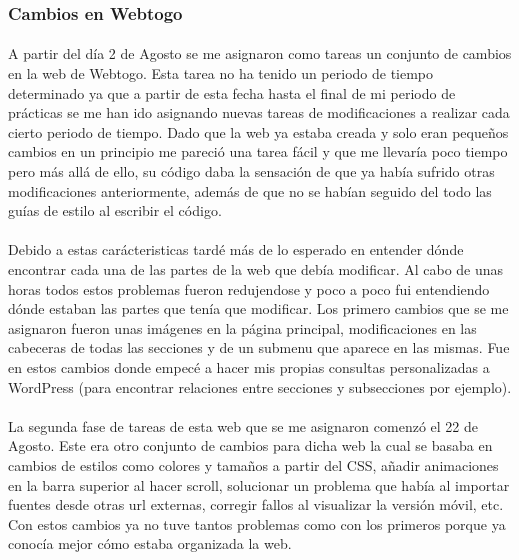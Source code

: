 \documentclass[11pt, a4paper,spanish]{article}
\begin{document}
            \subsubsection{Cambios en Webtogo}

                \paragraph{}
                A partir del día 2 de Agosto se me asignaron como tareas un conjunto de cambios en la web de Webtogo. Esta tarea no ha tenido un periodo de tiempo determinado ya que a partir de esta fecha hasta el final de mi periodo de prácticas se me han ido asignando nuevas tareas de modificaciones a realizar cada cierto periodo de tiempo. Dado que la web ya estaba creada y solo eran pequeños cambios en un principio me pareció una tarea fácil y que me llevaría poco tiempo pero más allá de ello, su código daba la sensación de que ya había sufrido otras modificaciones anteriormente, además de que no se habían seguido del todo las guías de estilo al escribir el código.

                \paragraph{}
                Debido a estas carácteristicas tardé más de lo esperado en entender dónde encontrar cada una de las partes de la web que debía modificar. Al cabo de unas horas todos estos problemas fueron redujendose y poco a poco fui entendiendo dónde estaban las partes que tenía que modificar. Los primero cambios que se me asignaron fueron unas imágenes en la página principal, modificaciones en las cabeceras de todas las secciones y de un submenu que aparece en las mismas. Fue en estos cambios donde empecé a hacer mis propias consultas personalizadas a WordPress (para encontrar relaciones entre secciones y subsecciones por ejemplo).

                \paragraph{}
                La segunda fase de tareas de esta web que se me asignaron comenzó el 22 de Agosto. Este era otro conjunto de cambios para dicha web la cual se basaba en cambios de estilos como colores y tamaños a partir del CSS, añadir animaciones en la barra superior al hacer scroll, solucionar un problema que había al importar fuentes desde otras url externas, corregir fallos al visualizar la versión móvil, etc. Con estos cambios ya no tuve tantos problemas como con los primeros porque ya conocía mejor cómo estaba organizada la web.
\end{document}
